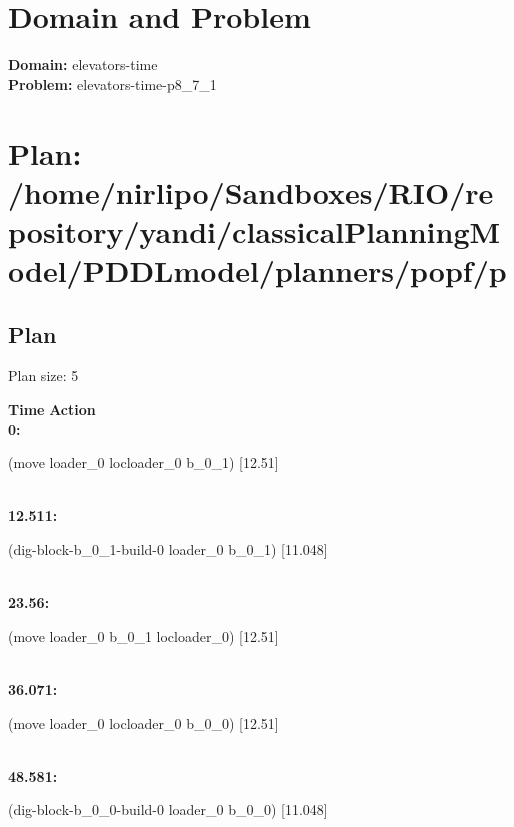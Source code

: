\documentclass[a4paper,12pt]{article}
\author{\mbox{\sc {\sc Val}}}
\newcommand{\headingtimeaction}{{\bf Time} \qquad \= {\bf Action}\\[0.8ex]}
\newcommand{\atime}[1]{{\bf #1:}}
\newcommand{\action}[1]{{\sf #1}}
\newcommand{\listrow}[1]{\begin{minipage}[t]{11.5cm} #1 \end{minipage}}
\begin{document}
 \maketitle 
\section{Domain and Problem}
{\bf Domain:} elevators-time\\
{\bf Problem:} elevators-time-p8\_7\_1
\section{\sloppy Plan: /\-home/\-nirlipo/\-Sandboxes/\-RIO/\-repository/\-yandi/\-classicalPlanningModel/\-PDDLmodel/\-planners/\-popf/\-p}
\subsection{Plan}
Plan size: 5
\begin{tabbing}
\headingtimeaction 
\atime{0} \> \listrow{\action{(move loader\_0 locloader\_0 b\_0\_1) [12.51]}}\\
\atime{12.511} \> \listrow{\action{(dig-block-b\_0\_1-build-0 loader\_0 b\_0\_1) [11.048]}}\\
\atime{23.56} \> \listrow{\action{(move loader\_0 b\_0\_1 locloader\_0) [12.51]}}\\
\atime{36.071} \> \listrow{\action{(move loader\_0 locloader\_0 b\_0\_0) [12.51]}}\\
\atime{48.581} \> \listrow{\action{(dig-block-b\_0\_0-build-0 loader\_0 b\_0\_0) [11.048]}}\\
\end{tabbing}
\end{document}
